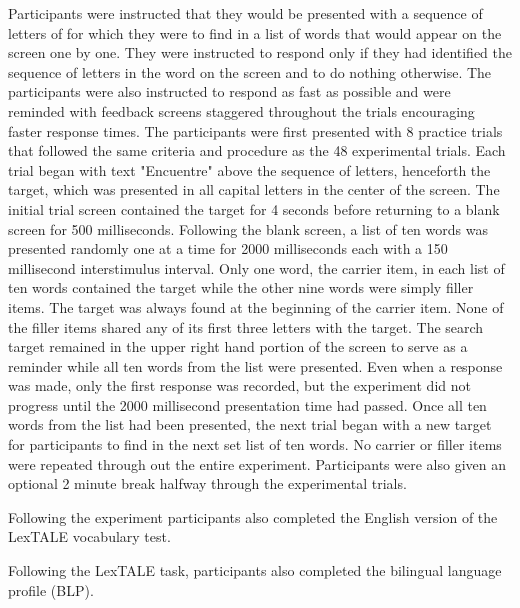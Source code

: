 Participants were instructed that they would be presented with a sequence of letters of for which they were to find in a list of words that would appear on the screen one by one. They were instructed to respond only if they had identified the sequence of letters in the word on the screen and to do nothing otherwise. The participants were also instructed to respond as fast as possible and were reminded with feedback screens staggered throughout the trials encouraging faster response times. The participants were first presented with 8 practice trials that followed the same criteria and procedure as the 48 experimental trials. Each trial began with text "Encuentre" above the sequence of letters, henceforth the target, which was presented in all capital letters in the center of the screen. The initial trial screen contained the target for 4 seconds before returning to a blank screen for 500 milliseconds. Following the blank screen, a list of ten words was presented randomly one at a time for 2000 milliseconds each with a 150 millisecond interstimulus interval. Only one word, the carrier item, in each list of ten words contained the target while the other nine words were simply filler items. The target was always found at the beginning of the carrier item. None of the filler items shared any of its first three letters with the target. The search target remained in the upper right hand portion of the screen to serve as a reminder while all ten words from the list were presented. Even when a response was made, only the first response was recorded, but the experiment did not progress until the 2000 millisecond presentation time had passed. Once all ten words from the list had been presented, the next trial began with a new target for participants to find in the next set list of ten words. No carrier or filler items were repeated through out the entire experiment. Participants were also given an optional 2 minute break halfway through the experimental trials.

Following the experiment participants also completed the English version of the LexTALE vocabulary test. 

Following the LexTALE task, participants also completed the bilingual language profile (BLP).

